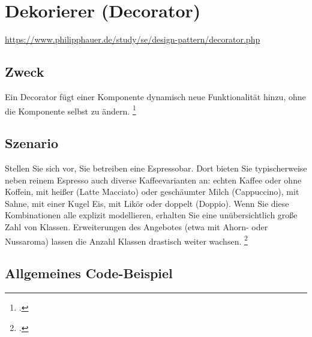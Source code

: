 \documentclass{bschlangaul-haupt}
\begin{document}

\chapter{Dekorierer (Decorator)}

\begin{liQuellen}
\item \cite{wiki:dekorierer}
\item \cite[Seite 149-156]{gof}
\item \url{https://www.philipphauer.de/study/se/design-pattern/decorator.php}
\item \cite[Kapitel 8.5.2, Seite 274-278]{schatten}
\item \cite[Seite 274]{schatten}
\item \cite[Kapitel 5.3, Seite 83-86]{eilebrecht}
\item \cite[Kapitel 22, Seite 269]{siebler}
\end{liQuellen}

%

\section{Zweck}

Ein Decorator fügt einer Komponente dynamisch neue Funktionalität
hinzu, ohne die Komponente selbst zu ändern.
\footcite[Seite 83]{eilebrecht}

\liEntwurfsDekoriererUml

\section{Szenario}

Stellen Sie sich vor, Sie betreiben eine Espressobar. Dort bieten Sie
typischerweise neben reinem Espresso auch diverse Kaffeevarianten an:
echten Kaffee oder ohne Koffein, mit heißer (Latte Macciato) oder
geschäumter Milch (Cappuccino), mit Sahne, mit einer Kugel Eis, mit
Likör oder doppelt (Doppio). Wenn Sie diese Kombinationen alle explizit
modellieren, erhalten Sie eine unübersichtlich große Zahl von Klassen.
Erweiterungen des Angebotes (etwa mit Ahorn- oder Nussaroma) lassen die
Anzahl Klassen drastisch weiter wachsen.
\footcite[Seite 83]{eilebrecht}

%

\section{Allgemeines Code-Beispiel}

\liEntwurfsDekoriererCode

\literatur
\end{document}
